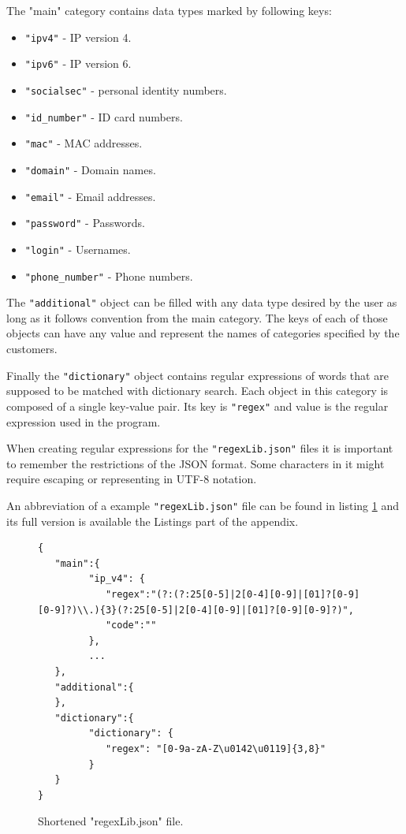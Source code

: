 \documentclass[a4paper,twoside,12pt]{book}
\begin{document}
The "main" category contains data types marked by following keys:

\begin{itemize}
   \item \lstinline|"ipv4"| - IP version 4.
   \item \lstinline|"ipv6"| - IP version 6.
   \item \lstinline|"socialsec"| - personal identity numbers.
   \item \lstinline|"id_number"| - ID card numbers.
   \item \lstinline|"mac"| - MAC addresses.
   \item \lstinline|"domain"| - Domain names.
   \item \lstinline|"email"| - Email addresses.
   \item \lstinline|"password"| - Passwords.
   \item \lstinline|"login"| - Usernames.
   \item \lstinline|"phone_number"| - Phone numbers.
\end{itemize} 

The \lstinline|"additional"| object can be filled with any data type desired by the user as long 
as it follows convention from the main category. The keys of each of those objects can have any value and represent the names of categories
specified by the customers.

Finally the \lstinline|"dictionary"| object contains regular expressions of words that are supposed to be matched with dictionary search. Each object in this category 
is composed of a single key-value pair. Its key is \lstinline|"regex"| and value is the regular expression used in the program. 

When creating regular expressions for the \lstinline|"regexLib.json"| files it is important to remember the restrictions of the 
JSON format. Some characters in it might require escaping or representing in UTF-8 notation.

An abbreviation of a example \lstinline|"regexLib.json"| file can be found in listing \ref{fig:regexLibSimple} and its full version is available the Listings part of the appendix.

\begin{figure}
\centering
\begin{lstlisting}
{
   "main":{
         "ip_v4": {
            "regex":"(?:(?:25[0-5]|2[0-4][0-9]|[01]?[0-9][0-9]?)\\.){3}(?:25[0-5]|2[0-4][0-9]|[01]?[0-9][0-9]?)",
            "code":""
         },
         ...
   },
   "additional":{
   },
   "dictionary":{
         "dictionary": {
            "regex": "[0-9a-zA-Z\u0142\u0119]{3,8}"
         }
   }
}
\end{lstlisting}
\caption{Shortened "regexLib.json" file.}
\label{fig:regexLibSimple}
\end{figure}
\end{document}
